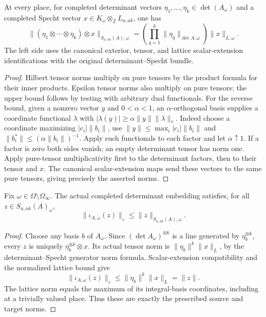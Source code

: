 \begin{lemma}
\label{lem:contraction-determinant-specht-generator-norm}
\leanok
At every place, for completed determinant vectors
$\eta_1,\ldots,\eta_k\in\det(A_\omega)$ and a completed Specht vector
$x\in K_\omega\otimes_{\mathbb Z}L_{a,ak}$, one has
\[
 \| (\eta_1\otimes\cdots\otimes\eta_k)\otimes x\|_{S_{a,ak}(A),\omega}
 =\left(\prod_{q=1}^k\|\eta_q\|_{\det A,\omega}\right)\|x\|_{L,\omega}.
\]
The left side uses the canonical exterior, tensor, and lattice scalar-extension
identifications with the original determinant--Specht bundle.
\end{lemma}
\begin{proof}
Hilbert tensor norms multiply on pure tensors by the product formula for
their inner products. Epsilon tensor norms also multiply on pure tensors:
the upper bound follows by testing with arbitrary dual functionals.
For the reverse bound, given a nonzero vector $y$ and $0<\alpha<1$, an
$\alpha$-orthogonal basis supplies a coordinate functional $\lambda$ with
$|\lambda(y)|\geq\alpha\|y\|\|\lambda\|_*$. Indeed choose a coordinate
maximizing $|c_i|\|b_i\|$, use
$\|y\|\leq\max_i|c_i|\|b_i\|$ and
$\|b_i^*\|\leq(\alpha\|b_i\|)^{-1}$.
Apply such functionals to each factor and let $\alpha\uparrow1$.
If a factor is zero both sides vanish; an empty determinant tensor has norm
one. Apply pure-tensor multiplicativity first to the determinant factors,
then to their tensor and $x$. The canonical scalar-extension maps send these
vectors to the same pure tensors, giving precisely the asserted norms.
\end{proof}

\begin{lemma}
\label{lem:contraction-finite-specht}
\leanok
Fix $\omega\in\Omega\setminus\Omega_\infty$.
The actual completed determinant embedding satisfies, for all
$z\in S_{a,ak}(A)_\omega$,
\[
 \|\iota_{A,\omega}(z)\|_\varepsilon\leq\|z\|_{S_{a,ak}(A),\omega}.
\]
\end{lemma}
\begin{proof}
Choose any basis $b$ of $A_\omega$.
Since $(\det A_\omega)^{\otimes k}$ is a line generated by
$\eta_b^{\otimes k}$, every $z$ is uniquely
$\eta_b^{\otimes k}\otimes x$. Its actual tensor norm is
$\|\eta_b\|^k\|x\|_L$, by the determinant--Specht generator norm formula.
Scalar-extension compatibility and the normalized lattice bound give
\[
 \|\iota_{A,\omega}(z)\|_\varepsilon
 \leq\|\eta_b\|^k\|x\|_L=\|z\|.
\]
The lattice norm equals the maximum of its integral-basis coordinates,
including at a trivially valued place. Thus these are exactly the prescribed
source and target norms.
\end{proof}

